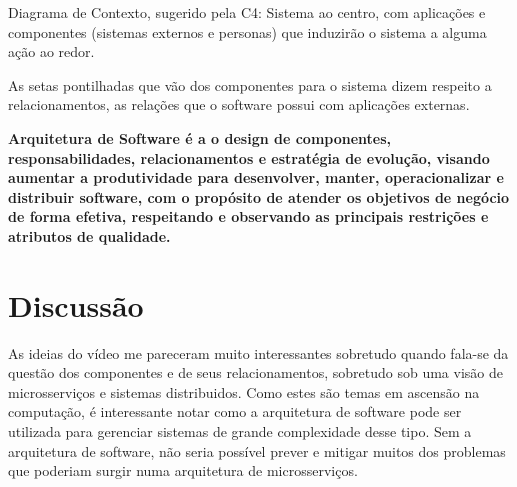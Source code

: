 \documentclass[article, a4paper, oneside, 11pt, english, brazil, sumario=tradicional]{abntex2}
\begin{document}
Diagrama  de  Contexto,  sugerido  pela C4:  Sistema  ao  centro,  com
aplicações e componentes (sistemas  externos e personas) que induzirão
o sistema a alguma ação ao redor.

As  setas pontilhadas  que vão  dos componentes  para o  sistema dizem
respeito  a relacionamentos,  as relações  que o  software possui  com
aplicações externas.

\begin{center}
\textbf{Arquitetura   de   Software   é    a   o   design   de   componentes, responsabilidades, relacionamentos  e estratégia de  evolução, visando aumentar a  produtividade para desenvolver, manter,  operacionalizar e
distribuir  software,  com o  propósito  de  atender os  objetivos  de negócio de forma efetiva, respeitando e observando as principais restrições e atributos de qualidade.}
\end{center}

\section{Discussão}
\label{sec:org3c8b795}

As ideias do  vídeo me pareceram muito  interessantes sobretudo quando
fala-se  da  questão  dos   componentes  e  de  seus  relacionamentos,
sobretudo    sob   uma    visão   de    microsserviços   e    sistemas
distribuidos.  Como  estes são  temas  em  ascensão na  computação,  é
interessante notar como  a arquitetura de software  pode ser utilizada
para  gerenciar sistemas  de  grande complexidade  desse  tipo. Sem  a
arquitetura de  software, não seria  possível prever e  mitigar muitos
dos problemas que poderiam surgir numa arquitetura de microsserviços.
\end{document}
